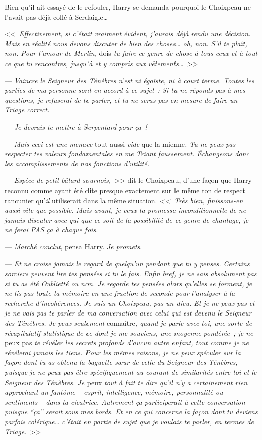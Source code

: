 Bien qu'il ait essayé de le refouler, Harry se demanda pourquoi le Choixpeau ne l'avait pas déjà collé à Serdaigle…

<<~\emph{Effectivement, si c'était vraiment évident, j'aurais déjà rendu une décision. Mais en réalité nous devons discuter de bien des choses… oh, non. S'il te plaît, non. Pour l'amour de Merlin,} dois\emph{-tu faire ce genre de chose à tous ceux et à tout ce que tu rencontres, jusqu'à et y compris aux vêtements…}~>>

--- \emph{Vaincre le Seigneur des Ténèbres n'est ni égoïste, ni à court terme. Toutes les parties de ma personne sont en accord à ce sujet~: Si tu ne réponds pas à mes questions, je refuserai de te parler, et tu ne seras pas en mesure de faire un Triage correct.}

--- \emph{Je devrais te mettre à Serpentard pour ça~!}

--- \emph{Mais ceci est une menace} tout aussi \emph{vide} que la mienne\emph{. Tu ne peux pas respecter tes valeurs fondamentales en me Triant faussement. Échangeons donc les accomplissements de nos fonctions d'utilité.}

--- \emph{Espèce de petit bâtard sournois,}~>> dit le Choixpeau, d'une façon que Harry reconnu comme ayant été dite presque exactement sur le même ton de respect rancunier qu'\emph{il} utiliserait dans la même situation. \emph{<<~Très bien, finissons-en aussi vite que possible. Mais avant, je veux ta promesse inconditionnelle de ne jamais discuter avec qui que ce soit de la possibilité de ce genre de chantage, je ne ferai PAS ça à chaque fois.}

--- \emph{Marché conclut}, pensa Harry. \emph{Je promets}.

--- \emph{Et ne croise jamais le regard de quelqu'un pendant que tu y penses. Certains sorciers peuvent lire tes pensées si tu le fais. Enfin bref, je ne sais absolument pas si tu as été Oublietté ou non. Je regarde tes pensées alors qu'elles se forment, je ne lis pas toute ta mémoire en une fraction de seconde pour l'analyser à la recherche d'incohérences. Je suis un Choixpeau, pas un dieu. Et je ne peux pas et je ne vais pas te parler de ma conversation avec celui qui est devenu le Seigneur des Ténèbres. Je peux seulement} connaître\emph{, quand je parle avec toi, une sorte de récapitulatif statistique de ce dont je me souviens, une moyenne pondérée~; je ne} peux pas \emph{te révéler les secrets profonds d'aucun autre enfant, tout comme je ne révélerai jamais les tiens. Pour les mêmes raisons, je ne peux spéculer sur la façon dont tu as obtenu la baguette sœur de celle du Seigneur des Ténèbres, puisque je ne peux pas être spécifiquement au courant de similarités entre toi et le Seigneur des Ténèbres. Je} peux \emph{tout à fait te dire qu'il n'y a certainement rien approchant un fantôme -- esprit, intelligence, mémoire, personnalité ou sentiments -- dans ta cicatrice. Autrement ça participerait à cette conversation puisque “ça” serait sous mes bords. Et en ce qui concerne la façon dont tu deviens parfois colérique… c'était en partie de sujet que je voulais te parler, en termes de Triage.}~>>


